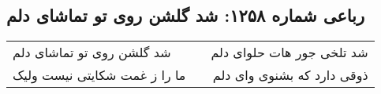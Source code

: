 \begin{center}
\section*{رباعی شماره ۱۲۵۸: شد گلشن روی تو تماشای دلم}
\label{sec:1258}
\begin{longtable}{l p{0.5cm} r}
شد گلشن روی تو تماشای دلم
&&
شد تلخی جور هات حلوای دلم
\\
ما را ز غمت شکایتی نیست ولیک
&&
ذوقی دارد که بشنوی وای دلم
\\
\end{longtable}
\end{center}
